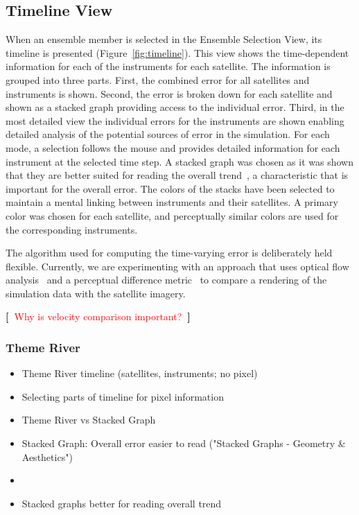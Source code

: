 \documentclass[journal]{vgtc}                %
\newcommand{\todo}[1] {\textbf{[~}\textcolor {red}{#1}\marginpar{\textcolor {red}{\centerline{{\Huge \textbf{!}}}}}\textbf{~]}}
\newcommand{\todo}[1] {\textbf{[~}\textcolor {red}{#1}\marginpar{\textcolor {red}{\centerline{{\Huge \textbf{!}}}}}\textbf{~]}}
\begin{document}
\subsection{Timeline View} \label{sec:timeline}
When an ensemble member is selected in the Ensemble Selection View, its timeline is presented (Figure~\ref{fig:timeline}). This view shows the time-dependent information for each of the instruments for each satellite. The information is grouped into three parts. First, the combined error for all satellites and instruments is shown. Second, the error is broken down for each satellite and shown as a stacked graph providing access to the individual error. Third, in the most detailed view the individual errors for the instruments are shown enabling detailed analysis of the potential sources of error in the simulation. For each mode, a selection follows the mouse and provides detailed information for each instrument at the selected time step. A stacked graph was chosen as it was shown that they are better suited for reading the overall trend~\cite{byron2008stacked}, a characteristic that is important for the overall error. The colors of the stacks have been selected to maintain a mental linking between instruments and their satellites. A primary color was chosen for each satellite, and perceptually similar colors are used for the corresponding instruments.

The algorithm used for computing the time-varying error is deliberately held flexible. Currently, we are experimenting with an approach that uses optical flow analysis~\cite{sun2010secrets} and a perceptual difference metric~\cite{yee2004perceptual} to compare a rendering of the simulation data with the satellite imagery.

\todo{Why is velocity comparison important?}

\subsubsection{Theme River}
\begin{itemize}
\item Theme River timeline (satellites, instruments; no pixel)
\item Selecting parts of timeline for pixel information

\item Theme River vs Stacked Graph
\item Stacked Graph: Overall error easier to read ("Stacked Graphs - Geometry \& Aesthetics")
\item \cite{havre2002themeriver}
\item Stacked graphs better for reading overall trend\cite{byron2008stacked}
\end{itemize}
\end{document}
